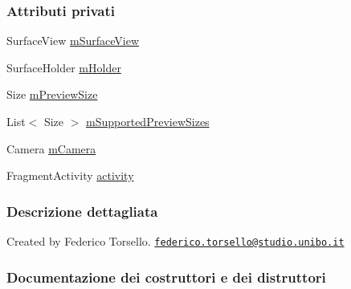 \subsubsection*{Attributi privati}
\begin{DoxyCompactItemize}
\item 
Surface\+View \hyperlink{classit_1_1unibo_1_1torsello_1_1bluetoothpositioning_1_1util_1_1CameraPreviewUtil_a41e834d4998c7df0228da7b4b517f9b0_a41e834d4998c7df0228da7b4b517f9b0}{m\+Surface\+View}
\item 
Surface\+Holder \hyperlink{classit_1_1unibo_1_1torsello_1_1bluetoothpositioning_1_1util_1_1CameraPreviewUtil_ad2698fd1398d4a6491b1e0b071a956db_ad2698fd1398d4a6491b1e0b071a956db}{m\+Holder}
\item 
Size \hyperlink{classit_1_1unibo_1_1torsello_1_1bluetoothpositioning_1_1util_1_1CameraPreviewUtil_a48550a4bc1d9358ae5de55f1109a2966_a48550a4bc1d9358ae5de55f1109a2966}{m\+Preview\+Size}
\item 
List$<$ Size $>$ \hyperlink{classit_1_1unibo_1_1torsello_1_1bluetoothpositioning_1_1util_1_1CameraPreviewUtil_a4aeb809017d527738a2b2be1ebe2cb39_a4aeb809017d527738a2b2be1ebe2cb39}{m\+Supported\+Preview\+Sizes}
\item 
Camera \hyperlink{classit_1_1unibo_1_1torsello_1_1bluetoothpositioning_1_1util_1_1CameraPreviewUtil_a7ee402da8ec64412f9a68e68b4025eea_a7ee402da8ec64412f9a68e68b4025eea}{m\+Camera}
\item 
Fragment\+Activity \hyperlink{classit_1_1unibo_1_1torsello_1_1bluetoothpositioning_1_1util_1_1CameraPreviewUtil_ab3f45258d2ab144fd4be5db55d278c42_ab3f45258d2ab144fd4be5db55d278c42}{activity}
\end{DoxyCompactItemize}


\subsubsection{Descrizione dettagliata}
Created by Federico Torsello. \href{mailto:federico.torsello@studio.unibo.it}{\tt federico.\+torsello@studio.\+unibo.\+it} 

\subsubsection{Documentazione dei costruttori e dei distruttori}
\hypertarget{classit_1_1unibo_1_1torsello_1_1bluetoothpositioning_1_1util_1_1CameraPreviewUtil_aa0b929d195ddb472745e4c26d576758e_aa0b929d195ddb472745e4c26d576758e}{}\label{classit_1_1unibo_1_1torsello_1_1bluetoothpositioning_1_1util_1_1CameraPreviewUtil_aa0b929d195ddb472745e4c26d576758e_aa0b929d195ddb472745e4c26d576758e} 
